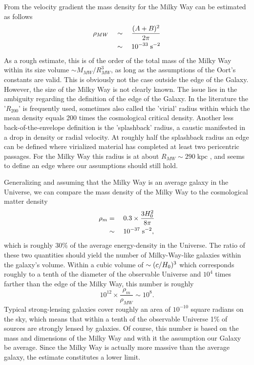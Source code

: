 From the velocity gradient the mass density for the Milky Way can be estimated
as follows
%
\begin{equation}\eqlbl{MWrho}
    \begin{aligned}
        \rho_{MW} &\quad\sim\quad \frac{(A+B)^2}{2\pi} \\
                  &\quad\sim\quad 10^{-33}\;\secs^{-2}
    \end{aligned}
\end{equation}
%
As a rough estimate, this is of the order of the total mass of the Milky Way
within its size volume $\sim M_{MW} / R_{MW}^3$, as long as the
assumptions of the Oort's constants are valid.  This is obviously not the case
outside the edge of the Galaxy.  However, the size of the Milky Way is not
clearly known.  The issue lies in the ambiguity regarding the definition of the
edge of the Galaxy.  In the literature the '$R_{200}$' is frequently used,
sometimes also called the 'virial' radius within which the mean density equals
200 times the cosmological critical density.  Another less back-of-the-envelope
definition is the 'splashback' radius, a caustic manifested in a drop in density
or radial velocity.  At roughly half the splashback radius an edge can be
defined where virialized material has completed at least two pericentric
passages.  For the Milky Way this radius is at about $R_{MW} \sim
290\;\mathrm{kpc}$ , and seems to define an edge where our
assumptions should still hold. 

Generalizing and assuming that the Milky Way is an average galaxy in the
Universe, we can compare the mass density of the Milky Way to the cosmological
matter density
%
\begin{equation}
    \begin{aligned}
        \rho_{m} &=\quad 0.3\times\frac{3H_{0}^{2}}{8\pi} \\
                 &\sim\quad 10^{-37}\;\mathrm{s}^{-2},
    \end{aligned}
\end{equation}
%
which is roughly 30\% of the average energy-density in the Universe.  The ratio
of these two quantities should yield the number of Milky-Way-like galaxies
within the galaxy's volume. Within a cubic volume of $\sim (c/H_{0}{})^{3}$ which
corresponds roughly to a tenth of the diameter of the observable Universe and
$10^4$ times farther than the edge of the Milky Way, this number is roughly
%
\begin{equation*}
    10^{12}\times\frac{\rho_m}{\rho_{MW}} \sim 10^{8}.
\end{equation*}
%
Typical strong-lensing galaxies cover roughly an area of $10^{-10}$ square
radians on the sky, which means that within a tenth of the observable Universe
1\% of sources are strongly lensed by galaxies.  Of course, this number is based
on the mass and dimensions of the Milky Way and with it the assumption our
Galaxy be average.  Since the Milky Way is actually more massive than the
average galaxy, the estimate constitutes a lower limit. 

